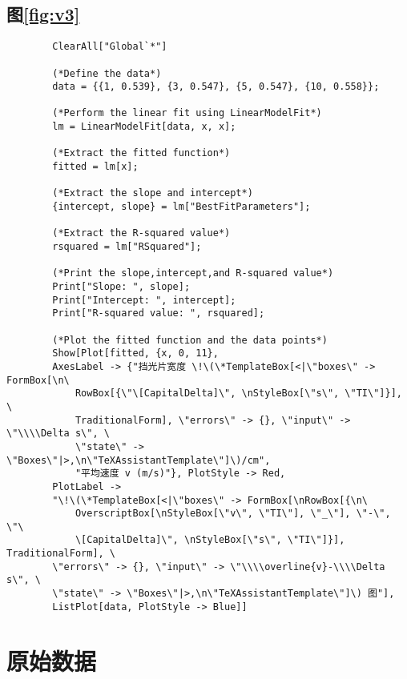 \documentclass[11pt]{article}
\begin{document}
	\subsection{图\ref{fig:v3}}
	\begin{lstlisting}
		ClearAll["Global`*"]
		
		(*Define the data*)
		data = {{1, 0.539}, {3, 0.547}, {5, 0.547}, {10, 0.558}};
		
		(*Perform the linear fit using LinearModelFit*)
		lm = LinearModelFit[data, x, x];
		
		(*Extract the fitted function*)
		fitted = lm[x];
		
		(*Extract the slope and intercept*)
		{intercept, slope} = lm["BestFitParameters"];
		
		(*Extract the R-squared value*)
		rsquared = lm["RSquared"];
		
		(*Print the slope,intercept,and R-squared value*)
		Print["Slope: ", slope];
		Print["Intercept: ", intercept];
		Print["R-squared value: ", rsquared];
		
		(*Plot the fitted function and the data points*)
		Show[Plot[fitted, {x, 0, 11}, 
		AxesLabel -> {"挡光片宽度 \!\(\*TemplateBox[<|\"boxes\" -> FormBox[\n\
			RowBox[{\"\[CapitalDelta]\", \nStyleBox[\"s\", \"TI\"]}], \
			TraditionalForm], \"errors\" -> {}, \"input\" -> \"\\\\Delta s\", \
			\"state\" -> \"Boxes\"|>,\n\"TeXAssistantTemplate\"]\)/cm", 
			"平均速度 v (m/s)"}, PlotStyle -> Red, 
		PlotLabel -> 
		"\!\(\*TemplateBox[<|\"boxes\" -> FormBox[\nRowBox[{\n\
			OverscriptBox[\nStyleBox[\"v\", \"TI\"], \"_\"], \"-\", \"\
			\[CapitalDelta]\", \nStyleBox[\"s\", \"TI\"]}], TraditionalForm], \
		\"errors\" -> {}, \"input\" -> \"\\\\overline{v}-\\\\Delta s\", \
		\"state\" -> \"Boxes\"|>,\n\"TeXAssistantTemplate\"]\) 图"], 
		ListPlot[data, PlotStyle -> Blue]]
	\end{lstlisting}


	\section{原始数据}
	
\end{document}
